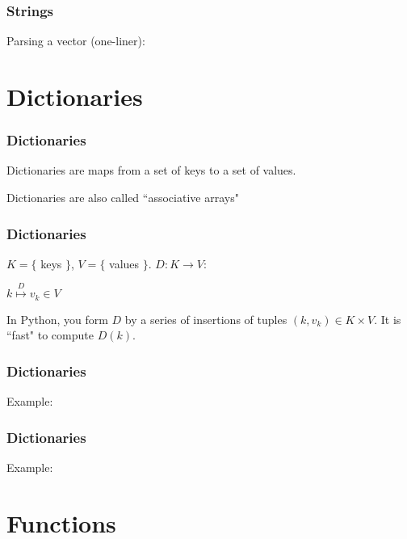 \documentclass{beamer}
\begin{document}
\begin{frame}
\frametitle{Strings}
Parsing a vector (one-liner):

\end{frame}


\section{Dictionaries}

\begin{frame}
\frametitle{Dictionaries}

Dictionaries are maps from a set of keys to a set of values.

\vspace{0.2in}

Dictionaries are also called ``associative arrays"
\end{frame}


\begin{frame}
\frametitle{Dictionaries}

$K = \{$ keys $\}$, $V = \{$ values $\}$.  $D: K \rightarrow V$:

\huge{
\begin{center}
$k \stackrel{D}{\longmapsto} v_k \in V$
\end{center}
} \normalsize{}

\vspace{0.2in}

In Python, you form $D$ by a series of insertions of tuples $(k, v_k) \in K \times V$.  It is ``fast" to compute $D(k)$.

\end{frame}

\begin{frame}
\frametitle{Dictionaries}

Example:


\end{frame}


\begin{frame}
\frametitle{Dictionaries}

Example:


\end{frame}

\section{Functions}
\end{document}
